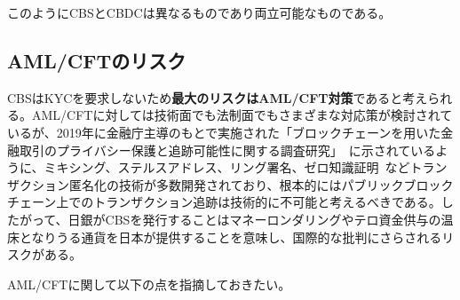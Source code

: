 \documentclass[dvipdfmx,a4paper]{jsarticle}
\begin{document}
このようにCBSとCBDCは異なるものであり両立可能なものである。

\subsection{AML/CFTのリスク}

CBSはKYCを要求しないため\textbf{最大のリスクはAML/CFT対策}であると考えられる。AML/CFTに対しては技術面でも法制面でもさまざまな対応策が検討されているが、2019年に金融庁主導のもとで実施された「ブロックチェーンを用いた金融取引のプライバシー保護と追跡可能性に関する調査研究」~\cite{blockchainprivacy}に示されているように、ミキシング、ステルスアドレス、リング署名、ゼロ知識証明~\cite{sasson2014zerocash}などトランザクション匿名化の技術が多数開発されており、根本的にはパブリックブロックチェーン上でのトランザクション追跡は技術的に不可能と考えるべきである。したがって、日銀がCBSを発行することはマネーロンダリングやテロ資金供与の温床となりうる通貨を日本が提供することを意味し、国際的な批判にさらされるリスクがある。

AML/CFTに関して以下の点を指摘しておきたい。
\end{document}
